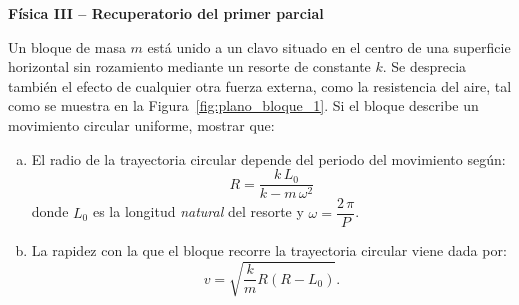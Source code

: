 \documentclass[addpoints]{exam}
\begin{document}
\renewcommand{\tablename}{Tabla}


\begin{tcolorbox}[colback=white,arc=0mm,colframe=black]
    \begin{center}
        \Large\textbf{Física III -- Recuperatorio del primer parcial}
    \end{center}
\end{tcolorbox}

\vspace{11pt}

\begin{questions}

    \question Un bloque de masa $m$ está unido a un clavo situado en el centro de una superficie horizontal sin rozamiento mediante un resorte de constante $k$. Se desprecia también el efecto de cualquier otra fuerza externa, como la resistencia del aire, tal como se muestra en la Figura~\ref{fig:plano_bloque_1}. Si el bloque describe un movimiento circular uniforme, mostrar que: \label{ej:plano_bloque_1} 
    \begin{enumerate}[a)]
        \item El radio de la trayectoria circular depende del periodo del movimiento según: $$ R = \frac{k \, L_0}{k - m \, \omega^2} $$ donde $L_0$ es la longitud \emph{natural} del resorte y $\omega = \dfrac{2 \, \pi}{P} $.
        \item La rapidez con la que el bloque recorre la trayectoria circular viene dada por: $$ v = \sqrt{\frac{k}{m} R \left(R - L_0\right)}. $$
    \end{enumerate}


\end{questions}
\end{document}
